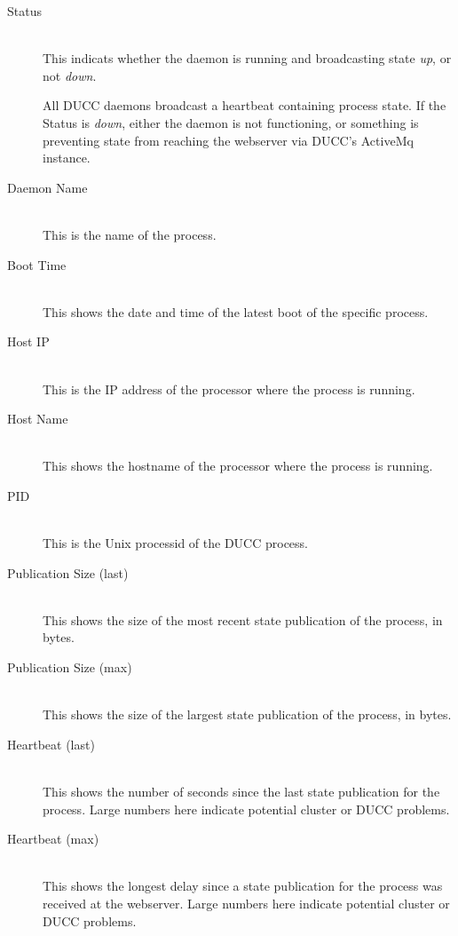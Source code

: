    \begin{description}
      \item[Status] \hfill \\
        This indicats whether the daemon is running and broadcasting state {\em up},
        or not {\em down}.  
        
        All DUCC daemons broadcast a heartbeat containing process state.  If the Status
        is {\em down}, either the daemon is not functioning, or something is preventing
        state from reaching the webserver via DUCC's ActiveMq instance.

      \item[Daemon Name] \hfill \\
        This is the name of the process.

      \item[Boot Time] \hfill \\ 
        This shows the date and time of the latest boot of the specific process.
          
      \item[Host IP] \hfill \\ 
        This is the IP address of the processor where the process is running.

      \item[Host Name] \hfill \\ 
        This shows the hostname of the processor where the process is running.

      \item[PID] \hfill \\ 
        This is the Unix processid of the DUCC process.


      \item[Publication Size (last)] \hfill \\ 
        This shows the size of the most recent state publication of the process, in bytes.

      \item[Publication Size (max)] \hfill \\ 
        This shows the size of the largest state publication of the process, in bytes.

      \item[Heartbeat (last)] \hfill \\ 
        This shows the number of seconds since the last state publication for the process. 
         Large numbers here indicate potential cluster or DUCC problems.

      \item[Heartbeat (max)] \hfill \\ 
        This shows the longest delay since a state publication for the process was received
        at the webserver.  Large numbers here indicate potential cluster or DUCC problems.


\end{description}

